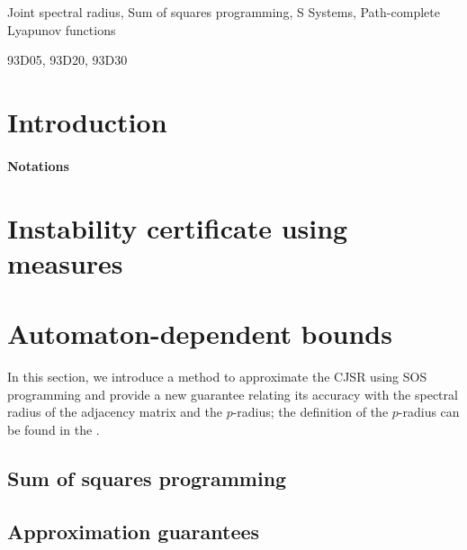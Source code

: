 \documentclass[review]{siamart1116}
\begin{document}
\maketitle

\begin{abstract}
  
\end{abstract}

\begin{keywords}
  Joint spectral radius, Sum of squares programming,
  S\witch{} Systems, Path-complete Lyapunov functions
\end{keywords}

\begin{AMS}
  93D05, 93D20, 93D30
\end{AMS}

\section{Introduction}


\paragraph{Notations}


\section{Instability certificate using measures}
\label{sec:inf}


\section{Automaton-dependent bounds}
In this section, we introduce a method to approximate the CJSR using SOS programming and provide a new guarantee relating its accuracy with the spectral radius of the adjacency matrix and the $p$-radius; the definition of the $p$-radius can be found in the .
\label{sec:primal}


\subsection{Sum of squares programming}
\label{sec:sosprog}




\subsection{Approximation guarantees}
\label{sec:quality}

\end{document}
